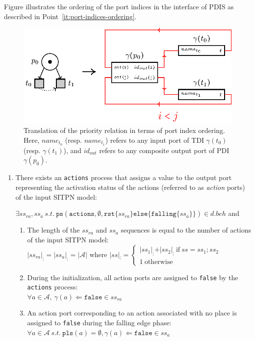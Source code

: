 \begin{definition}
  \bigskip

  Figure illustrates the ordering of the port indices in the interface
  of PDIS as described in Point~\ref{it:port-indices-ordering}.

  \begin{figure}[h]
    \centering
    \includegraphics[keepaspectratio,width=.8\textwidth]{gen-prio-order.eps}
    \caption{Translation of the priority relation in terms of port
      index ordering. Here, $name_{t_0}$ (resp. $name_{t_1}$) refers
      to any input port of TDI $\gamma(t_0)$ (resp. $\gamma(t_1)$),
      and $id_{out}$ refers to any composite output port of PDI
      $\gamma(p_0)$.}
    \label{fig:gen-prio-order}
  \end{figure}

  \begin{enumerate}[resume]
  \item\label{it:actions} There exists an \texttt{actions} process
    that assigns a value to the output port representing the
    activation status of the actions (referred to as \textit{action}
    ports) of the input SITPN model:
    
    $\exists{}ss_{ra},ss_{a}~s.t.~\mathtt{ps}(\mathtt{actions},\emptyset,\mathtt{rst}\{ss_{ra}\}\mathtt{else}\{\mathtt{falling}\{ss_a\}\})\in{}d.beh$
    and
    \begin{enumerate}
    \item The length of the $ss_{ra}$ and $ss_{a}$ sequences is equal
      to the number of actions of the input SITPN model:\\
      $\vert{}ss_{ra}\vert_{;}=\vert{}ss_a\vert_{;}=\vert\mathcal{A}\vert$ where $\vert{}ss\vert{}_{;}=
      \begin{cases}
        \vert{}ss_1\vert_{;}+\vert{}ss_2\vert_{;}~\mathrm{if}~ss=ss_1;ss_2 \\
        1~\mathrm{otherwise}
      \end{cases}
      $
    \item During the initialization, all action ports are assigned to
      \texttt{false} by the \texttt{actions} process:\\
      $\forall{}a\in\mathcal{A},~\gamma(a)\Leftarrow\mathtt{false}\in{}ss_{ra}$
    \item An action port corresponding to an action associated with no
      place is assigned to \texttt{false} during the falling edge
      phase:\\
      $\forall{}a\in\mathcal{A}~s.t.~\mathtt{pls}(a)=\emptyset,\gamma(a)\Leftarrow\mathtt{false}\in{}ss_{a}$
      

\end{enumerate}
\end{enumerate}
\end{definition}
